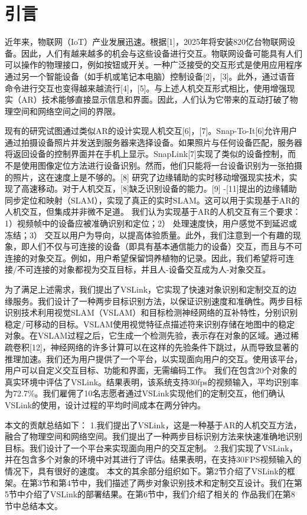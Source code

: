 \chapter{引言}

近年来，物联网（IoT）产业发展迅速。根据[1]，2025年将安装820亿台物联网设备。因此，人们有越来越多的机会与这些设备进行交互。物联网设备可能具有人们可以操作的物理接口，例如按钮或开关。一种广泛接受的交互形式是使用应用程序通过另一个智能设备（如手机或笔记本电脑）控制设备[2]，[3]。此外，通过语音命令进行交互也变得越来越流行[4]，[5]。与上述人机交互形式相比，使用增强现实（AR）技术能够直接显示信息和界面。因此，人们认为它带来的互动打破了物理空间和网络空间之间的界限。

现有的研究试图通过类似AR的设计实现人机交互[6]，[7]。Snap-To-It[6]允许用户通过拍摄设备照片并发送到服务器来选择设备。如果照片与任何设备匹配，服务器将返回设备的控制界面并在手机上显示。SnapLink[7]实现了类似的设备控制，而不是使用图像定位方法进行设备识别。然而，他们只能将一台设备识别为一张拍摄的照片，这在速度上是不够的。[8] 研究了边缘辅助的实时移动增强现实技术，实现了高速移动。对于人机交互，[8]缺乏识别设备的能力。[9] -[11]提出的边缘辅助同步定位和映射（SLAM），实现了真正的实时SLAM。这可以用于实现基于AR的人机交互，但集成并非微不足道。
我们认为实现基于AR的人机交互有三个要求：1）视频帧中的设备应被准确识别和定位；2） 处理速度快，用户感觉不到延迟或冻结；3） 交互以用户为导向，以提高体验质量。此外，我们注意到一个有趣的现象，即人们不仅与可连接的设备（即具有基本通信能力的设备）交互，而且与不可连接的对象交互。例如，用户希望保留饲养植物的记录。因此，我们希望将可连接/不可连接的对象都视为交互目标，并且人-设备交互成为人-对象交互。

为了满足上述需求，我们提出了VSLink，它实现了快速对象识别和定制交互的边缘服务。我们设计了一种两步目标识别方法，以保证识别速度和准确性。两步目标识别技术利用视觉SLAM（VSLAM）和目标检测神经网络的互补特性，分别识别稳定/可移动的目标。VSLAM使用视觉特征点描述符来识别存储在地图中的稳定对象。在VSLAM过程之后，它生成一个检测先验，表示存在对象的区域。通过稀疏卷积[12]，神经网络的许多计算可以在这样的先验条件下跳过，从而导致显著的推理加速。我们还为用户提供了一个平台，以实现面向用户的交互。使用该平台，用户可以自定义交互目标、功能和界面，无需编码工作。
我们在包含20个对象的真实环境中评估了VSLink。结果表明，该系统支持30fps的视频输入，平均识别率为72.7\%。我们雇佣了10名志愿者通过VSLink实现他们的定制交互，他们确认VSLink的使用，设计过程的平均时间成本在两分钟内。

本文的贡献总结如下：
1.我们提出了VSLink，这是一种基于AR的人机交互方法，融合了物理空间和网络空间。我们提出了一种两步目标识别方法来快速准确地识别目标。我们设计了一个平台来实现面向用户的交互定制。
2.我们实现了VSLink，并在包含多个对象的环境中对其进行了评估。结果表明，在支持30FPS视频输入的情况下，具有很好的速度。
本文的其余部分组织如下。第2节介绍了VSLink的框架。在第3节和第4节中，我们描述了两步对象识别技术和定制交互设计。我们在第5节中介绍了VSLink的部署结果。在第6节中，我们介绍了相关的
作品我们在第8节中总结本文。

